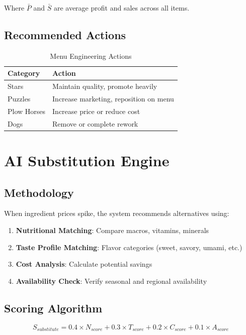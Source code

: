 \documentclass[11pt,a4paper]{article}
\begin{document}
Where $\bar{P}$ and $\bar{S}$ are average profit and sales across all items.

\subsection{Recommended Actions}

\begin{table}[h]
\centering
\begin{tabular}{@{}ll@{}}
\toprule
\textbf{Category} & \textbf{Action} \\
\midrule
Stars & Maintain quality, promote heavily \\
Puzzles & Increase marketing, reposition on menu \\
Plow Horses & Increase price or reduce cost \\
Dogs & Remove or complete rework \\
\bottomrule
\end{tabular}
\caption{Menu Engineering Actions}
\end{table}

\section{AI Substitution Engine}

\subsection{Methodology}
When ingredient prices spike, the system recommends alternatives using:

\begin{enumerate}
    \item \textbf{Nutritional Matching}: Compare macros, vitamins, minerals
    \item \textbf{Taste Profile Matching}: Flavor categories (sweet, savory, umami, etc.)
    \item \textbf{Cost Analysis}: Calculate potential savings
    \item \textbf{Availability Check}: Verify seasonal and regional availability
\end{enumerate}

\subsection{Scoring Algorithm}

\begin{equation}
    S_{substitute} = 0.4 \times N_{score} + 0.3 \times T_{score} + 0.2 \times C_{score} + 0.1 \times A_{score}
\end{equation}
\end{document}
